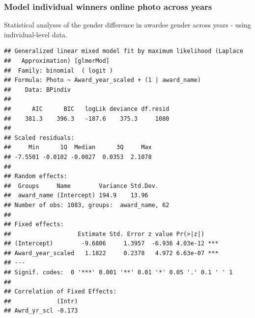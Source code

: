 \documentclass[
]{article}
\newenvironment{Shaded}{\begin{snugshade}}{\end{snugshade}}
\newcommand{\AttributeTok}[1]{\textcolor[rgb]{0.77,0.63,0.00}{#1}}
\newcommand{\CommentTok}[1]{\textcolor[rgb]{0.56,0.35,0.01}{\textit{#1}}}
\newcommand{\DecValTok}[1]{\textcolor[rgb]{0.00,0.00,0.81}{#1}}
\newcommand{\FunctionTok}[1]{\textcolor[rgb]{0.00,0.00,0.00}{#1}}
\newcommand{\NormalTok}[1]{#1}
\newcommand{\OtherTok}[1]{\textcolor[rgb]{0.56,0.35,0.01}{#1}}
\newcommand{\SpecialCharTok}[1]{\textcolor[rgb]{0.00,0.00,0.00}{#1}}
\newcommand{\StringTok}[1]{\textcolor[rgb]{0.31,0.60,0.02}{#1}}
\begin{document}
\hypertarget{model-individual-winners-online-photo-across-years}{%
\subsubsection{Model individual winners online photo across
years}\label{model-individual-winners-online-photo-across-years}}

Statistical analyses of the gender difference in awardee gender across
years - using individual-level data.

\begin{Shaded}
\end{Shaded}

\begin{verbatim}
## Generalized linear mixed model fit by maximum likelihood (Laplace
##   Approximation) [glmerMod]
##  Family: binomial  ( logit )
## Formula: Photo ~ Award_year_scaled + (1 | award_name)
##    Data: BPindiv
## 
##      AIC      BIC   logLik deviance df.resid 
##    381.3    396.3   -187.6    375.3     1080 
## 
## Scaled residuals: 
##     Min      1Q  Median      3Q     Max 
## -7.5501 -0.0102 -0.0027  0.0353  2.1078 
## 
## Random effects:
##  Groups     Name        Variance Std.Dev.
##  award_name (Intercept) 194.9    13.96   
## Number of obs: 1083, groups:  award_name, 62
## 
## Fixed effects:
##                   Estimate Std. Error z value Pr(>|z|)    
## (Intercept)        -9.6806     1.3957  -6.936 4.03e-12 ***
## Award_year_scaled   1.1822     0.2378   4.972 6.63e-07 ***
## ---
## Signif. codes:  0 '***' 0.001 '**' 0.01 '*' 0.05 '.' 0.1 ' ' 1
## 
## Correlation of Fixed Effects:
##             (Intr)
## Awrd_yr_scl -0.173
\end{verbatim}
\end{document}
